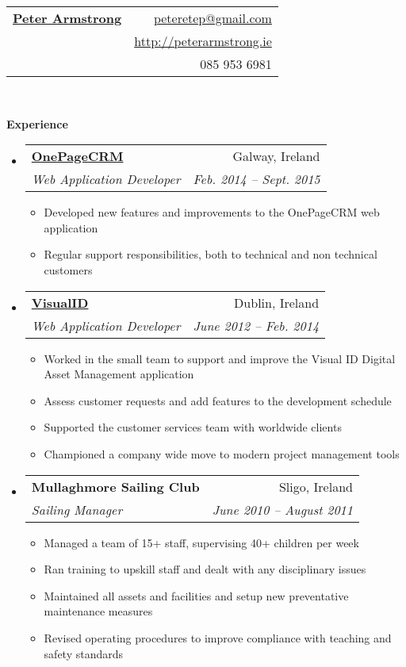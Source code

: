 \documentclass[letterpaper,11pt]{article}
\makeatletter
\newcommand{\resitem}[1]{\item #1 \vspace{-2pt}}
\newcommand{\resheading}[1]{{\large \colorbox{mygrey}{\begin{minipage}{\textwidth}{\textbf{#1 \vphantom{p\^{E}}}}\end{minipage}}}}
\newcommand{\ressubheading}[4]{
\begin{tabular*}{6.5in}{l@{\extracolsep{\fill}}r}
		\textbf{#1} & #2 \\
		\textit{#3} & \textit{#4} \\
\end{tabular*}\vspace{-6pt}}
\makeatother
\begin{document}
\newcommand{\mywebheader}{
\begin{tabular*}{7in}{l@{\extracolsep{\fill}}r}
	\textbf{\href{http://www.peterarmstrong.ie/}{\LARGE Peter Armstrong}} & \href{mailto:peteretep@gmail.com}{peteretep@gmail.com}\\
	& \href{http://www.peterarmstrong.ie}{http://peterarmstrong.ie} \\ & 085 953 6981
	\end{tabular*}
\\
\vspace{0.1in}}

\mywebheader


\resheading{Experience}
	\begin{itemize}
    \item 
      \ressubheading{\href{http://www.onepagecrm.com}{OnePageCRM}}{Galway, Ireland}
        {Web Application Developer}{Feb. 2014 -- Sept. 2015}
        {
        \begin{itemize}
          \resitem{Developed new features and improvements to the OnePageCRM web application }
          \resitem{Regular support responsibilities, both to technical and non technical customers}
        \end{itemize}
        }

      \item 
      \ressubheading{\href{http://visualid.com}{VisualID}}{Dublin, Ireland}{Web Application Developer}{June 2012 -- Feb. 2014}
        {
        \begin{itemize}
          \resitem{Worked in the small team to support and improve the Visual ID Digital Asset Management application}
          \resitem{Assess customer requests and add features to the development schedule}
          \resitem{Supported the customer services team with worldwide clients}
          \resitem{Championed a company wide move to modern project management tools}
        \end{itemize}
        }      
    \item
        \ressubheading{Mullaghmore Sailing Club}{Sligo, Ireland}{Sailing Manager}{June 2010 -- August 2011}
        {
        \begin{itemize}
        \resitem{Managed a team of 15+ staff, supervising 40+ children per week}
        \resitem{Ran training to upskill staff and dealt with any disciplinary issues}
        \resitem{Maintained all assets and facilities and setup new preventative maintenance measures}
        \resitem{Revised operating procedures to improve compliance with teaching and safety standards}
        \end{itemize}
        }
        

\end{itemize}
\end{document}
